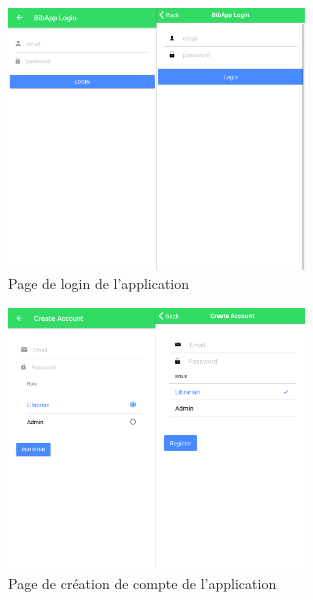 \documentclass[a4paper, 12pt]{article}
\begin{document}
\begin{figure}
    \begin{center}
        \includegraphics[width=0.7\textwidth]{images/screenshots/android_iphone_5.png}
    \end{center}
    \caption{Page de login de l'application}
\end{figure}
\begin{figure}
    \begin{center}
        \includegraphics[width=0.7\textwidth]{images/screenshots/android_iphone_6.png}
    \end{center}
    \caption{Page de création de compte de l'application}
\end{figure}
\end{document}
